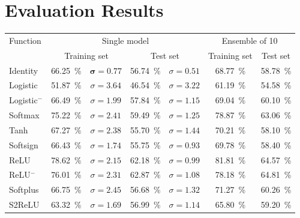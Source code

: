 \section*{Evaluation Results}
\begin{table}[H]
    \centering
    \begin{tabular}{@{\extracolsep{4pt}}lcccccc@{}}
    \toprule
    \multirow{2}{*}{Function} & \multicolumn{4}{c}{Single model}                                                    & \multicolumn{2}{c}{Ensemble of 10} \\\cline{2-3}\cline{4-5}\cline{6-7}
                   & \multicolumn{2}{c}{Training set}     &\multicolumn{2}{c}{Test set}                  & Training set         & Test set \\\midrule
    Identity       & \SI{66.25}{\percent} & $\boldsymbol{\sigma=0.77}$ &\SI{56.74}{\percent} & \textbf{$\sigma=0.51$} & \SI{68.77}{\percent} & \SI{58.78}{\percent}\\
    Logistic       & \SI{51.87}{\percent} & $\sigma=3.64$ &\SI{46.54}{\percent} & $\sigma=3.22$          & \SI{61.19}{\percent} & \SI{54.58}{\percent}\\
    Logistic$^-$   & \SI{66.49}{\percent} & $\sigma=1.99$ &\SI{57.84}{\percent} & $\sigma=1.15$          & \SI{69.04}{\percent} & \SI{60.10}{\percent}\\
    Softmax        & \SI{75.22}{\percent} & $\sigma=2.41$ &\SI{59.49}{\percent} & $\sigma=1.25$          & \SI{78.87}{\percent} & \SI{63.06}{\percent}\\
    Tanh           & \SI{67.27}{\percent} & $\sigma=2.38$ &\SI{55.70}{\percent} & $\sigma=1.44$          & \SI{70.21}{\percent} & \SI{58.10}{\percent}\\
    Softsign       & \SI{66.43}{\percent} & $\sigma=1.74$ &\SI{55.75}{\percent} & $\sigma=0.93$          & \SI{69.78}{\percent} & \SI{58.40}{\percent}\\
    \gls{ReLU}     & \SI{78.62}{\percent} & $\sigma=2.15$ &\SI{62.18}{\percent} & $\sigma=0.99$          & \SI{81.81}{\percent} & \SI{64.57}{\percent}\\
    \gls{ReLU}$^-$ & \SI{76.01}{\percent} & $\sigma=2.31$ &\SI{62.87}{\percent} & $\sigma=1.08$          & \SI{78.18}{\percent} & \SI{64.81}{\percent}\\
    Softplus       & \SI{66.75}{\percent} & $\sigma=2.45$ &\SI{56.68}{\percent} & $\sigma=1.32$          & \SI{71.27}{\percent} & \SI{60.26}{\percent}\\
    S2ReLU         & \SI{63.32}{\percent} & $\sigma=1.69$ &\SI{56.99}{\percent} & $\sigma=1.14$          & \SI{65.80}{\percent} & \SI{59.20}{\percent}\\

\end{tabular}
\end{table}
